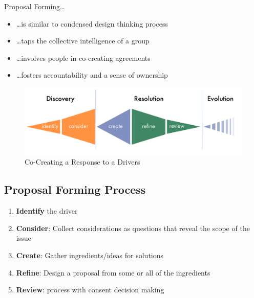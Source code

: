 Proposal Forming{\ldots}

\begin{itemize}
\item {\ldots}is similar to condensed design thinking process

\item {\ldots}taps the collective intelligence of a group

\item {\ldots}involves people in co-creating agreements

\item {\ldots}fosters accountability and a sense of ownership

\end{itemize}

\begin{figure}[htbp]
\centering
\includegraphics[keepaspectratio,width=\textwidth,height=0.75\textheight]{img/proposal-forming/proposal-forming.png}
\caption{Co-Creating a Response to a Drivers}
\end{figure}

\subsection{Proposal Forming Process}
\label{proposalformingprocess}

\begin{enumerate}
\item \textbf{Identify} the driver

\item \textbf{Consider}: Collect considerations as questions that reveal the scope of the issue

\item \textbf{Create}: Gather ingredients\slash ideas for solutions

\item \textbf{Refine}: Design a proposal from some or all of the ingredients

\item \textbf{Review}: process with consent decision making

\end{enumerate}


